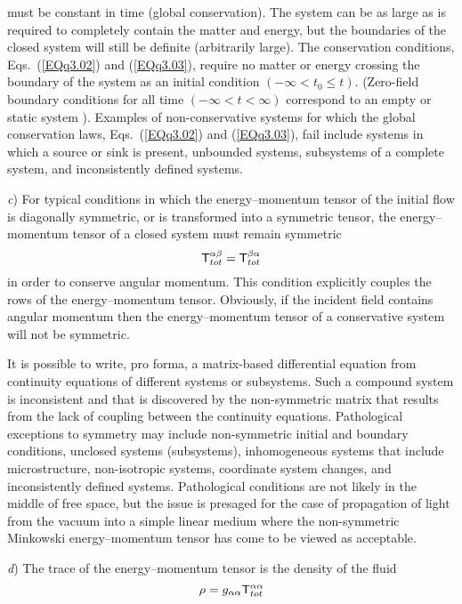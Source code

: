 \documentclass[twocolumn,amssymb,eqsecnum,aps,pra]{revtex4-2}
\begin{document}
must be constant in time (global conservation).
The system can be as large as is required to completely contain
the matter and energy, but the boundaries of the closed
system will still be definite (arbitrarily large).
The conservation conditions, Eqs.~(\ref{EQq3.02}) and (\ref{EQq3.03}),
require no matter or energy crossing the boundary of the system as an
initial condition $(-\infty < t_0 \leq t)$.
(Zero-field boundary conditions for all time $(-\infty <t< \infty)$
correspond to an empty or static system \cite{BIWang2}).
Examples of non-conservative systems for which the global conservation
laws, Eqs.~(\ref{EQq3.02}) and (\ref{EQq3.03}), fail include systems
in which a source or sink is present, unbounded systems, subsystems
of a complete system, and inconsistently defined systems.
\par
\textit{c}) For typical conditions in which the energy--momentum
tensor of the initial flow is diagonally symmetric,
or is transformed into a symmetric tensor, the energy--momentum
tensor of a closed system must remain symmetric
\begin{equation}
{\sf T}_{tot}^{\alpha\beta}={\sf T}_{tot}^{\beta\alpha}
\label{EQq3.04}
\end{equation}
in order to conserve angular momentum.
This condition explicitly couples the rows of the energy--momentum
tensor.
Obviously, if the incident field contains angular momentum then the
energy--momentum tensor of a conservative system will not be symmetric.
\par
It is possible to write, pro forma, a matrix-based differential
equation from continuity equations of different systems or subsystems.
Such a compound system is inconsistent and that is discovered 
by the non-symmetric matrix that results from the lack of coupling
between the continuity equations.
Pathological exceptions to symmetry may include non-symmetric initial
and boundary conditions, unclosed systems (subsystems), inhomogeneous
systems that include microstructure, non-isotropic systems,
coordinate system changes, and inconsistently defined systems.
Pathological conditions are not likely in the middle of free space,
but the issue is presaged for the case of propagation of light from
the vacuum into a simple linear medium where the non-symmetric
Minkowski energy--momentum tensor has come to be viewed as acceptable.
\par
\textit{d}) The trace of the energy--momentum tensor is the density
of the fluid
\begin{equation}
\rho=g_{\alpha\alpha}{\sf T}_{tot}^{\alpha\alpha}
\label{EQq3.05}
\end{equation}
\end{document}
